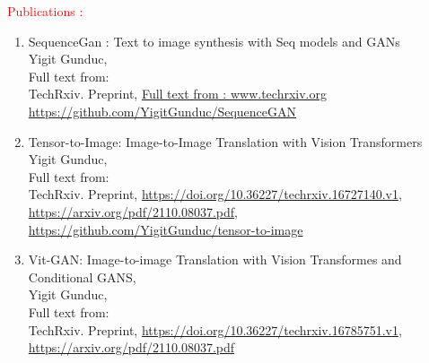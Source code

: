 \documentclass[a4paper]{article}
\begin{document}
\vskip 0.5cm
\textcolor{red}{\huge Publications : \hfill}\\
\begin{enumerate}
\item SequenceGan : Text to image synthesis with Seq models and GANs\\
  Yigit Gunduc,\hfill\\
Full text from:\hfill\\
 TechRxiv. Preprint, \href{https://www.techrxiv.org/articles/preprint/SequenceGan_text_to_image_synthesis_with_Seq_models_and_GANs/14922633}{Full text from : www.techrxiv.org }\\
  \href{https://github.com/YigitGunduc/SequenceGAN}{https://github.com/YigitGunduc/SequenceGAN}

\item Tensor-to-Image: Image-to-Image Translation with Vision Transformers\\
  Yigit Gunduc,\hfill\\
  Full text from:\hfill\\
  TechRxiv. Preprint, \href{https://doi.org/10.36227/techrxiv.16727140.v1}{https://doi.org/10.36227/techrxiv.16727140.v1},\\
  \href{https://arxiv.org/pdf/2110.08037.pdf}{https://arxiv.org/pdf/2110.08037.pdf},\\
  \href{https://github.com/YigitGunduc/tensor-to-image}{https://github.com/YigitGunduc/tensor-to-image}\\
  
\item Vit-GAN: Image-to-image Translation with Vision Transformes and Conditional GANS,\\
  Yigit Gunduc,\hfill\\
  Full text from:\hfill\\
  TechRxiv. Preprint, \href{https://doi.org/10.36227/techrxiv.16785751.v1}{https://doi.org/10.36227/techrxiv.16785751.v1},\\
\href{https://arxiv.org/pdf/2110.08037.pdf}{https://arxiv.org/pdf/2110.08037.pdf}
  
\end{enumerate}
\end{document}
